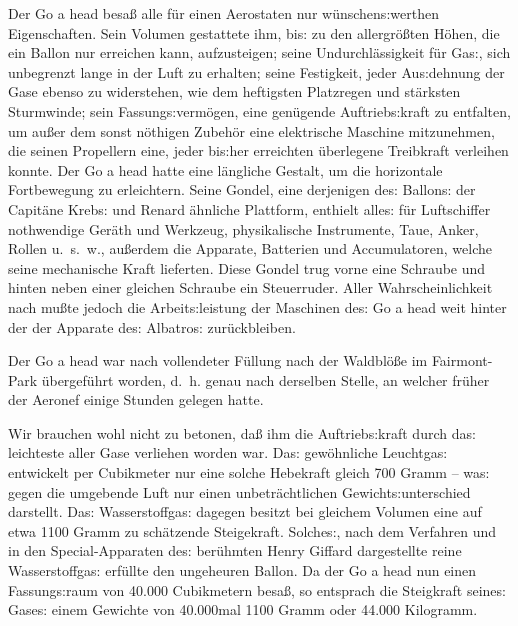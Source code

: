 \documentclass[oneside,12pt]{book}
\newenvironment{antiqua}{\normalfont}{}
\newcommand{\s}{s:}
\begin{document}
Der \begin{antiqua}Go a head\end{antiqua} besa{\ss} alle f\"ur einen
Aerostaten nur w\"unschen{\s}werthen Eigenschaften. Sein Volumen
gestattete ihm, bi{\s} zu den allergr\"o{\ss}ten H\"ohen, die ein
Ballon nur erreichen kann, aufzusteigen; seine Undurchl\"assigkeit
f\"ur Ga{\s}, sich unbegrenzt lange in der Luft zu erhalten; seine
Festigkeit, jeder Au{\s}dehnung der Gase ebenso zu widerstehen, wie
dem heftigsten Platzregen und st\"arksten Sturmwinde; sein
Fassung{\s}verm\"ogen, eine gen\"ugende Auftrieb{\s}kraft zu
entfalten, um au{\ss}er dem sonst n\"othigen Zubeh\"or eine
elektrische Maschine mit\/zunehmen, die seinen Propellern eine, jeder
bi{\s}her erreichten \"uberlegene Treibkraft verleihen konnte. Der
\begin{antiqua}Go a head\end{antiqua} hatte eine l\"angliche Gestalt,
um die horizontale Fortbewegung zu erleichtern. Seine Gondel, eine
derjenigen de{\s} Ballon{\s} der Capit\"ane Kreb{\s} und Renard
\"ahnliche Plattform, enthielt alle{\s} f\"ur Luftschiffer nothwendige
Ger\"ath und Werkzeug, physikalische Instrumente, Taue, Anker, Rollen
u.~s.~w., au{\ss}erdem die Apparate, Batterien und Accumulatoren,
welche seine mechanische Kraft lieferten. Diese Gondel trug vorne
eine Schraube und hinten neben einer gleichen Schraube ein
Steuerruder. Aller Wahrscheinlichkeit nach mu{\ss}te jedoch die
Arbeit{\s}leistung der Maschinen de{\s} \begin{antiqua}Go a
head\end{antiqua} weit hinter der der Apparate de{\s}
{\glqq}Albatro{\s}{\grqq} zur\"uckbleiben.

Der \begin{antiqua}Go a head\end{antiqua} war nach vollendeter
F\"ullung nach der Waldbl\"o{\ss}e im Fairmont-Park \"ubergef\"uhrt
worden, d.~h. genau nach derselben Stelle, an welcher fr\"uher der
Aeronef einige Stunden gelegen hatte.

Wir brauchen wohl nicht zu betonen, da{\ss} ihm die Auftrieb{\s}kraft
durch da{\s} leichteste aller Gase verliehen worden war. Da{\s}
gew\"ohnliche Leuchtga{\s} entwickelt per Cubikmeter nur eine solche
Hebekraft gleich 700 Gramm -- wa{\s} gegen die umgebende Luft nur
einen unbetr\"achtlichen Gewicht{\s}unterschied darstellt. Da{\s}
Wasserstoffga{\s} dagegen besitzt bei gleichem Volumen eine auf etwa
1100 Gramm zu sch\"atzende Steigekraft. Solche{\s}, nach dem
Verfahren und in den Special-Apparaten de{\s} ber\"uhmten Henry
Giffard dargestellte reine Wasserstoffga{\s} erf\"ullte den
ungeheuren Ballon. Da der \begin{antiqua}Go a head\end{antiqua} nun
einen Fassung{\s}raum von 40.000 Cubikmetern besa{\ss}, so entsprach
die Steigkraft seine{\s} Gase{\s} einem Gewichte von 40.000mal 1100
Gramm oder 44.000 Kilogramm.
\end{document}
